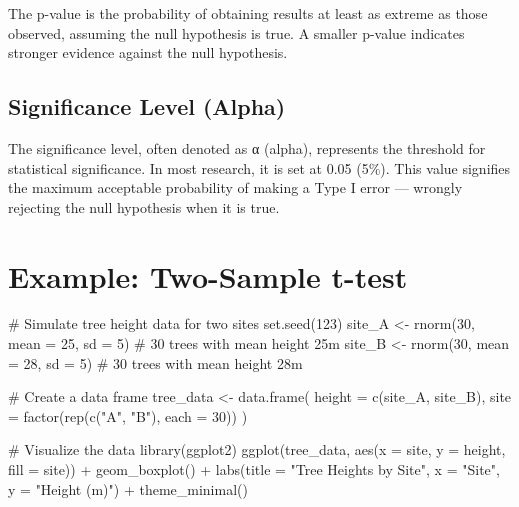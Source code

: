 \documentclass[
  letterpaper,
]{book}
\newenvironment{Shaded}{\begin{snugshade}}{\end{snugshade}}
\newcommand{\AttributeTok}[1]{\textcolor[rgb]{0.40,0.45,0.13}{#1}}
\newcommand{\CommentTok}[1]{\textcolor[rgb]{0.37,0.37,0.37}{#1}}
\newcommand{\DecValTok}[1]{\textcolor[rgb]{0.68,0.00,0.00}{#1}}
\newcommand{\FunctionTok}[1]{\textcolor[rgb]{0.28,0.35,0.67}{#1}}
\newcommand{\NormalTok}[1]{\textcolor[rgb]{0.00,0.23,0.31}{#1}}
\newcommand{\OtherTok}[1]{\textcolor[rgb]{0.00,0.23,0.31}{#1}}
\newcommand{\SpecialCharTok}[1]{\textcolor[rgb]{0.37,0.37,0.37}{#1}}
\newcommand{\StringTok}[1]{\textcolor[rgb]{0.13,0.47,0.30}{#1}}
\begin{document}
The p-value is the probability of obtaining results at least as extreme
as those observed, assuming the null hypothesis is true. A smaller
p-value indicates stronger evidence against the null hypothesis.

\subsection{Significance Level (Alpha)}\label{significance-level-alpha}

The significance level, often denoted as α (alpha), represents the
threshold for statistical significance. In most research, it is set at
0.05 (5\%). This value signifies the maximum acceptable probability of
making a Type I error --- wrongly rejecting the null hypothesis when it
is true.

\section{Example: Two-Sample t-test}\label{example-two-sample-t-test}

\begin{Shaded}
\begin{Highlighting}[]
\CommentTok{\# Simulate tree height data for two sites}
\FunctionTok{set.seed}\NormalTok{(}\DecValTok{123}\NormalTok{)}
\NormalTok{site\_A }\OtherTok{\textless{}{-}} \FunctionTok{rnorm}\NormalTok{(}\DecValTok{30}\NormalTok{, }\AttributeTok{mean =} \DecValTok{25}\NormalTok{, }\AttributeTok{sd =} \DecValTok{5}\NormalTok{)  }\CommentTok{\# 30 trees with mean height 25m}
\NormalTok{site\_B }\OtherTok{\textless{}{-}} \FunctionTok{rnorm}\NormalTok{(}\DecValTok{30}\NormalTok{, }\AttributeTok{mean =} \DecValTok{28}\NormalTok{, }\AttributeTok{sd =} \DecValTok{5}\NormalTok{)  }\CommentTok{\# 30 trees with mean height 28m}

\CommentTok{\# Create a data frame}
\NormalTok{tree\_data }\OtherTok{\textless{}{-}} \FunctionTok{data.frame}\NormalTok{(}
  \AttributeTok{height =} \FunctionTok{c}\NormalTok{(site\_A, site\_B),}
  \AttributeTok{site =} \FunctionTok{factor}\NormalTok{(}\FunctionTok{rep}\NormalTok{(}\FunctionTok{c}\NormalTok{(}\StringTok{"A"}\NormalTok{, }\StringTok{"B"}\NormalTok{), }\AttributeTok{each =} \DecValTok{30}\NormalTok{))}
\NormalTok{)}

\CommentTok{\# Visualize the data}
\FunctionTok{library}\NormalTok{(ggplot2)}
\FunctionTok{ggplot}\NormalTok{(tree\_data, }\FunctionTok{aes}\NormalTok{(}\AttributeTok{x =}\NormalTok{ site, }\AttributeTok{y =}\NormalTok{ height, }\AttributeTok{fill =}\NormalTok{ site)) }\SpecialCharTok{+}
  \FunctionTok{geom\_boxplot}\NormalTok{() }\SpecialCharTok{+}
  \FunctionTok{labs}\NormalTok{(}\AttributeTok{title =} \StringTok{"Tree Heights by Site"}\NormalTok{,}
       \AttributeTok{x =} \StringTok{"Site"}\NormalTok{,}
       \AttributeTok{y =} \StringTok{"Height (m)"}\NormalTok{) }\SpecialCharTok{+}
  \FunctionTok{theme\_minimal}\NormalTok{()}
\end{Highlighting}
\end{Shaded}
\end{document}
